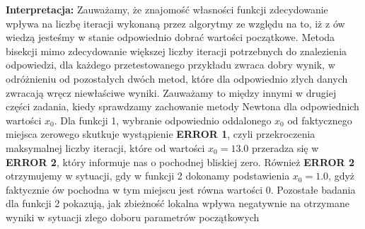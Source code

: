\documentclass[a4paper,14pt]{report}
\begin{document}
    \textbf{Interpretacja: } Zauważamy, że znajomość własności funkcji zdecydowanie wpływa na liczbę iteracji wykonaną przez algorytmy ze względu na to, iż z ów wiedzą jesteśmy w stanie odpowiednio dobrać wartości początkowe. Metoda bisekcji mimo zdecydowanie większej liczby iteracji potrzebnych do znalezienia odpowiedzi, dla każdego przetestowanego przykładu zwraca dobry wynik, w odróżnieniu od pozostałych dwóch metod, które dla odpowiednio złych danych zwracają wręcz niewłaściwe wyniki. Zauważamy to między innymi w drugiej części zadania, kiedy sprawdzamy zachowanie metody Newtona dla odpowiednich wartości $x_{0}$. Dla funkcji 1, wybranie odpowiednio oddalonego $x_{0}$ od faktycznego miejsca zerowego skutkuje wystąpienie \textbf{ERROR 1}, czyli przekroczenia maksymalnej liczby iteracji, które od wartości $x_{0}=13.0$ przeradza się w \textbf{ERROR 2}, który informuje nas o pochodnej bliskiej zero. Również \textbf{ERROR 2} otrzymujemy w sytuacji, gdy w funkcji 2 dokonamy podstawienia $x_{0}=1.0$, gdyż faktycznie ów pochodna w tym miejscu jest równa wartości 0.
    Pozostałe badania dla funkcji 2 pokazują, jak zbieżność lokalna wpływa negatywnie na otrzymane wyniki w sytuacji złego doboru parametrów początkowych
\end{document}
